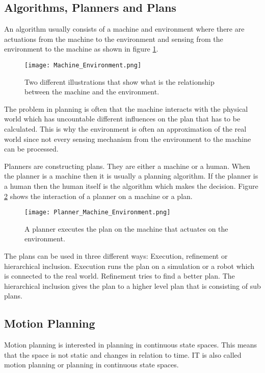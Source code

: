 \subsection{Algorithms, Planners and Plans}
An algorithm usually consists of a machine and environment where there are actuations from the machine to the environment and sensing from the environment to the machine as shown in figure \ref{fig:Machine and Environment interaction}.
\begin{figure}[H]
    \centering
    \texttt{[image: Machine\_Environment.png]}
    \caption{Two different illustrations that show what is the relationship between the machine and the environment. \cite{planning_algorithms_steven_m_lavalle}}
    \label{fig:Machine and Environment interaction}
\end{figure}
The problem in planning is often that the machine interacts with the physical world which has uncountable different influences on the plan that has to be calculated. This is why the environment is often an approximation of the real world since not every sensing mechanism from the environment to the machine can be processed.

Planners are constructing plans. They are either a machine or a human. When the planner is a machine then it is usually a planning algorithm. If the planner is a human then the human itself is the algorithm which makes the decision. Figure \ref{fig:Planner Machine Environment} shows the interaction of a planner on a machine or a plan.
\begin{figure}[H]
    \centering
    \texttt{[image: Planner\_Machine\_Environment.png]}
    \caption{A planner executes the plan on the machine that actuates on the environment. \cite{planning_algorithms_steven_m_lavalle}}
    \label{fig:Planner Machine Environment}
\end{figure}

The plans can be used in three different ways: Execution, refinement or hierarchical inclusion. Execution runs the plan on a simulation or a robot which is connected to the real world. Refinement tries to find a better plan. The hierarchical inclusion gives the plan to a higher level plan that is consisting of sub plans. \cite{planning_algorithms_steven_m_lavalle}

\subsection{Motion Planning}

Motion planning is interested in planning in continuous state spaces. This means that the space is not static and changes in relation to time. IT is also called motion planning or planning in continuous state spaces. \cite{planning_algorithms_steven_m_lavalle}

